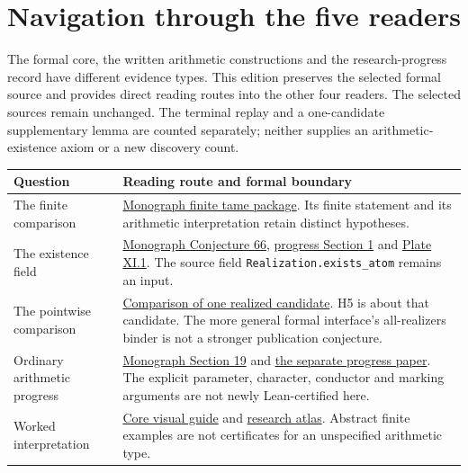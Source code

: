 \clearpage
\section*{Navigation through the five readers}
{}
The formal core, the written arithmetic constructions and the research-progress record have different evidence types. This edition preserves the selected formal source and provides direct reading routes into the other four readers. The selected sources remain unchanged. The terminal replay and a one-candidate supplementary lemma are counted separately; neither supplies an arithmetic-existence axiom or a new discovery count.

\begin{tabular}{@{}>{\raggedright\arraybackslash}p{.29\linewidth}>{\raggedright\arraybackslash}p{.66\linewidth}@{}}\toprule
Question & Reading route and formal boundary\\\midrule
The finite comparison & \href{https://komorebi.invalid/b07/lean_finite}{Monograph finite tame package}. Its finite statement and its arithmetic interpretation retain distinct hypotheses.\\[9pt]
The existence field & \href{https://komorebi.invalid/b07/lean_contract}{Monograph Conjecture 66}, \href{https://komorebi.invalid/b07/lean_research_contract}{progress Section 1} and \href{https://komorebi.invalid/b07/lean_v01}{Plate XI.1}. The source field \texttt{Realization.exists\_atom} remains an input.\\[9pt]
The pointwise comparison & \href{https://komorebi.invalid/b07/lean_comparison}{Comparison of one realized candidate}. H5 is about that candidate. The more general formal interface's all-realizers binder is not a stronger publication conjecture.\\[9pt]
Ordinary arithmetic progress & \href{https://komorebi.invalid/b07/lean_arithmetic}{Monograph Section 19} and \href{https://komorebi.invalid/b07/lean_progress}{the separate progress paper}. The explicit parameter, character, conductor and marking arguments are not newly Lean-certified here.\\[9pt]
Worked interpretation & \href{https://komorebi.invalid/b07/lean_core_visual}{Core visual guide} and \href{https://komorebi.invalid/b07/lean_atlas}{research atlas}. Abstract finite examples are not certificates for an unspecified arithmetic type.\\\bottomrule
\end{tabular}

